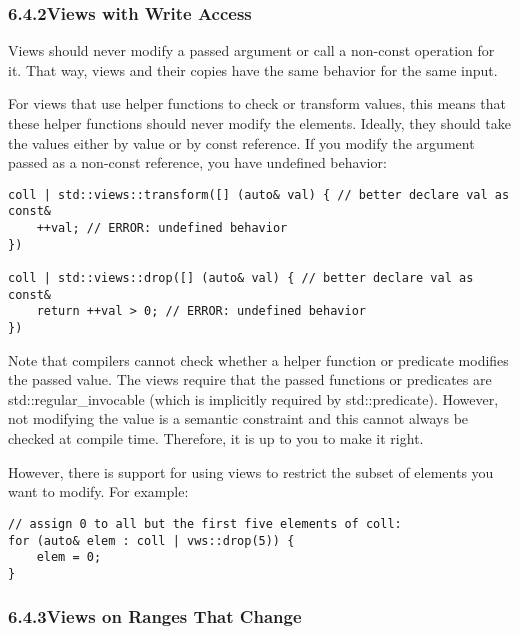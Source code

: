 \subsubsection*{ 6.4.2\hspace{0.2cm}Views with Write Access}

Views should never modify a passed argument or call a non-const operation for it. That way, views and their copies have the same behavior for the same input.

For views that use helper functions to check or transform values, this means that these helper functions should never modify the elements. Ideally, they should take the values either by value or by const reference. If you modify the argument passed as a non-const reference, you have undefined behavior:

\begin{lstlisting}[style=styleCXX]
coll | std::views::transform([] (auto& val) { // better declare val as const&
	++val; // ERROR: undefined behavior
})

coll | std::views::drop([] (auto& val) { // better declare val as const&
	return ++val > 0; // ERROR: undefined behavior
})
\end{lstlisting}

Note that compilers cannot check whether a helper function or predicate modifies the passed value. The views require that the passed functions or predicates are std::regular\_invocable (which is implicitly required by std::predicate). However, not modifying the value is a semantic constraint and this cannot always be checked at compile time. Therefore, it is up to you to make it right.

However, there is support for using views to restrict the subset of elements you want to modify. For example:

\begin{lstlisting}[style=styleCXX]
// assign 0 to all but the first five elements of coll:
for (auto& elem : coll | vws::drop(5)) {
	elem = 0;
}
\end{lstlisting}

\subsubsection*{ 6.4.3\hspace{0.2cm}Views on Ranges That Change}

